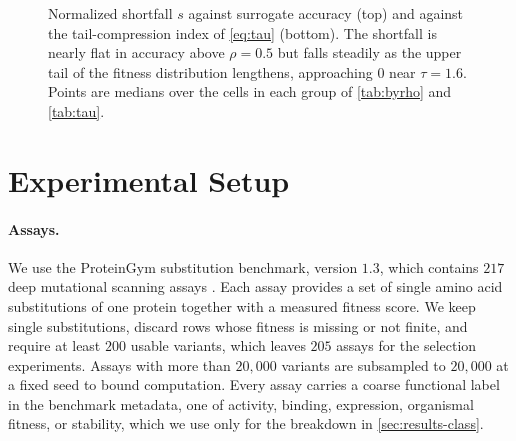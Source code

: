 \documentclass{article}
\theoremstyle{plain}
\theoremstyle{definition}
\begin{document}
\begin{figure}[t]
\begin{center}

\vskip 0.15in

\end{center}
\caption{Normalized shortfall $s$ against surrogate accuracy (top) and against the
tail-compression index of \cref{eq:tau} (bottom). The shortfall is nearly flat in
accuracy above $\rho = 0.5$ but falls steadily as the upper tail of the fitness
distribution lengthens, approaching $0$ near $\tau = 1.6$. Points are medians over the
cells in each group of \cref{tab:byrho} and \cref{tab:tau}.}
\label{fig:main}
\end{figure}


\section{Experimental Setup}
\label{sec:setup}

\paragraph{Assays.}
We use the ProteinGym substitution benchmark, version $1.3$, which contains $217$ deep
mutational scanning assays \citep{notin2023proteingym}. Each assay provides a set of
single amino acid substitutions of one protein together with a measured fitness score.
We keep single substitutions, discard rows whose fitness is missing or not finite, and
require at least $200$ usable variants, which leaves $205$ assays for the selection
experiments. Assays with more than $20{,}000$ variants are subsampled to $20{,}000$ at a
fixed seed to bound computation. Every assay carries a coarse functional label in the
benchmark metadata, one of activity, binding, expression, organismal fitness, or
stability, which we use only for the breakdown in \cref{sec:results-class}.
\end{document}
